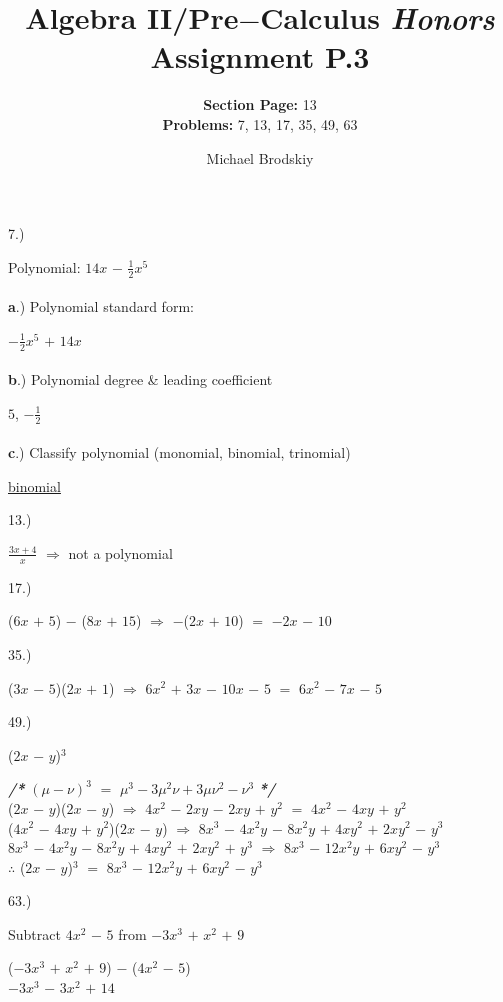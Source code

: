 \documentclass[12pt]{article}
\title{\textbf{Algebra II/Pre$-$Calculus \textit{Honors}}  \\ Assignment P.3}
\date{}
\subtitle{\textbf{Section Page:} 13\\\textbf{Problems:} 7, 13, 17, 35, 49, 63}
\author{Michael Brodskiy}
\begin{document}
\maketitle
{\setlength{\parindent}{0cm}
7.) 
    \begin{center} Polynomial: $14x$ $-$ $\frac{1}{2}x^5$ \end{center}
    \paragraph{}\textbf{a}.) Polynomial standard form:
        \begin{center} $-\frac{1}{2}x^5$ $+$ $14x$ \end{center}
    \paragraph{}\textbf{b}.) Polynomial degree \& leading coefficient
        \begin{center} $5$, $-\frac{1}{2}$ \end{center}
    \paragraph{}\textbf{c}.) Classify polynomial (monomial, binomial, trinomial)
        \begin{center} \underline{binomial} \end{center}
}
{\setlength{\parindent}{0cm}
13.) 
    \begin{center} $\frac{3x + 4}{x}$ $\Longrightarrow$ not a polynomial \end{center}
}
{\setlength{\parindent}{0cm}
17.) 
    \begin{center} ($6x$ $+$ $5$) $-$ ($8x$ $+$ $15$) $\Longrightarrow$ $-$($2x$ $+$ $10$) $=$ $-2x$ $-$ $10$ \end{center}
}
{\setlength{\parindent}{0cm}
35.)
    \begin{center} ($3x$ $-$ $5$)($2x$ $+$ $1$) $\Longrightarrow$ $6x^2$ $+$ $3x$ $-$ $10x$ $-$ $5$ $=$ $6x^2$ $-$ $7x$ $-$ $5$ \end{center}
}
{\setlength{\parindent}{0cm}
49.) 
    \begin{center} ($2x$ $-$ $y$)$^{3}$ \end{center}
    \begin{center}
        \textbf{\textit{/*}} $(\mu-\nu)^3$ $=$ $\mu^3-3\mu^2\nu+3\mu \nu^2-\nu^3$ \textbf{\textit{*/}} \\
        ($2x$ $-$ $y$)($2x$ $-$ $y$) $\Longrightarrow$ $4x^2$ $-$ $2xy$ $-$ $2xy$ $+$ $y^2$ $=$ $4x^2$ $-$ $4xy$ $+$ $y^2$ \\
        ($4x^2$ $-$ $4xy$ $+$ $y^2$)($2x$ $-$ $y$) $\Longrightarrow$ $8x^3$ $-$ $4x^2y$ $-$ $8x^2y$ $+$ $4xy^2$ $+$ $2xy^2$ $-$ $y^3$ \\
        $8x^3$ $-$ $4x^2y$ $-$ $8x^2y$ $+$ $4xy^2$ $+$ $2xy^2$ $+$ $y^3$ $\Longrightarrow$ $8x^3$ $-$ $12x^2y$ $+$ $6xy^2$ $-$ $y^3$ \\
        $\therefore$ ($2x$ $-$ $y$)$^{3}$ $=$ $8x^3$ $-$ $12x^2y$ $+$ $6xy^2$ $-$ $y^3$ 
    \end{center}
}
{\setlength{\parindent}{0cm}
63.) 
    \begin{center} Subtract $4x^2$ $-$ $5$ from $-3x^3$ $+$ $x^2$ $+$ $9$ \end{center} 
    \begin{center}
        ($-3x^3$ $+$ $x^2$ $+$ $9$) $-$ ($4x^2$ $-$ $5$) \\
        $-3x^3$ $-$ $3x^2$ $+$ $14$
    \end{center}
}
\end{document}
